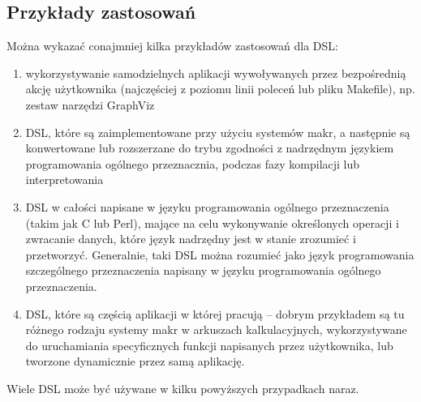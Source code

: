 \documentclass[a4paper,12pt,oneside]{report}
\begin{document}
\subsection{Przykłady zastosowań}
\label{sub:zastosowania}

Można wykazać conajmniej kilka przykładów zastosowań dla DSL:
\begin{enumerate}
  \item wykorzystywanie samodzielnych aplikacji wywoływanych przez bezpośrednią akcję użytkownika (najczęściej z poziomu linii poleceń lub pliku Makefile), np. zestaw narzędzi GraphViz
  \item DSL, które są zaimplementowane przy użyciu systemów makr, a następnie są konwertowane lub rozszerzane do trybu zgodności z nadrzędnym językiem programowania ogólnego przeznacznia, podczas fazy kompilacji lub interpretowania
  \item DSL w całości napisane w języku programowania ogólnego przeznaczenia (takim jak C lub Perl), mające na celu wykonywanie określonych operacji i zwracanie danych, które język nadrzędny jest w stanie zrozumieć i przetworzyć. Generalnie, taki DSL można rozumieć jako język programowania szczególnego przeznaczenia napisany w języku programowania ogólnego przeznaczenia.
  \item DSL, które są częścią aplikacji w której pracują -- dobrym przykładem są tu różnego rodzaju systemy makr w arkuszach kalkulacyjnych, wykorzystywane do uruchamiania specyficznych funkcji napisanych przez użytkownika, lub tworzone dynamicznie przez samą aplikację.
\end{enumerate}

Wiele DSL może być używane w kilku powyższych przypadkach naraz.
\end{document}
